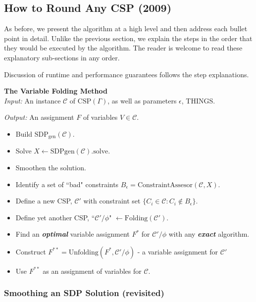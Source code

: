 \subsection{How to Round Any CSP (2009)}
As before, we present the algorithm at a high level and then address each bullet point in detail. Unlike the previous section, we explain the steps in the order that they would be executed by the algorithm. The reader is welcome to read these explanatory sub-sections in any order. 

Discussion of runtime and performance guarantees follows the step explanations.


\begin{algorithm} \textbf{The Variable Folding Method} \\

\textit{Input: } An instance $\mathcal{C}$ of $\text{CSP}(\Gamma)$, as well as parameters $\epsilon$, THINGS.

\textit{Output: } An assignment $F$ of variables $V \in \mathcal{C}$.
\begin{itemize}
\item Build $\text{SDP}_{\text{gen}}(\mathcal{C})$.
\item Solve $X \leftarrow \text{SDPgen}(\mathcal{C}).\text{solve}$.
\item Smoothen the solution.
\item Identify a set of ``bad" constraints $B_{\epsilon} = \text{ConstraintAssesor}(\mathcal{C},X)$.
\item Define a new CSP, $\mathcal{C}'$ with constraint set $\{C_i \in \mathcal{C} : C_i \not \in B_{\epsilon}\}$.
\item Define yet another CSP, ``$\mathcal{C}'/\phi$" $ \leftarrow \text{Folding}(\mathcal{C}')$.
\item Find an \textit{\textbf{optimal}} variable assignment $F^*$ for $\mathcal{C}'/\phi$ with any \textit{\textbf{exact}} algorithm.
\item Construct $F^{**} = \text{Unfolding}(F^*, \mathcal{C}'/\phi)$ - a variable assignment for $\mathcal{C}'$
\item Use $F^{**}$ as an assignment of variables for $\mathcal{C}$.
\end{itemize}
\end{algorithm}

\subsubsection{Smoothing an SDP Solution (revisited)}

